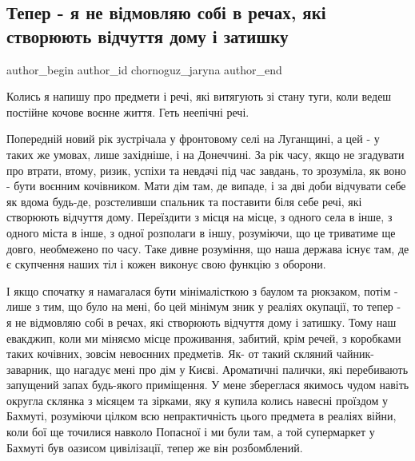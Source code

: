  
 
 
 
 

\subsection{Тепер - я не відмовляю собі в речах, які створюють відчуття дому і затишку}
\label{sec:31_12_2022.fb.chornoguz_jaryna.1.teper___ya_ne_v_dmov}

\ifcmt
 author_begin
   author_id chornoguz_jaryna
 author_end
\fi

Колись я напишу про предмети і речі, які витягують зі стану туги, коли ведеш
постійне кочове воєнне життя. Геть неепічні речі.

Попередній новий рік зустрічала у фронтовому селі на Луганщині, а цей - у таких
же умовах, лише західніше, і на Донеччині. За рік часу, якщо не згадувати про
втрати, втому, ризик, успіхи та невдачі під час завдань, то зрозуміла, як воно
- бути воєнним кочівником. Мати дім там, де випаде, і за дві доби відчувати
себе як вдома будь-де, розстеливши спальник та поставити біля себе речі, які
створюють відчуття дому. Переїздити з місця на місце, з одного села в інше, з
одного міста в інше, з одної розполаги в іншу, розуміючи, що це триватиме ще
довго, необмежено по часу. Таке дивне розуміння, що наша держава існує там, де
є скупчення наших тіл і кожен виконує свою функцію з оборони.

І якщо спочатку я намагалася бути мінімалісткою з баулом та рюкзаком, потім -
лише з тим, що було на мені, бо цей мінімум зник у реаліях окупації, то тепер -
я не відмовляю собі в речах, які створюють відчуття дому і затишку. Тому наш
евакджип, коли ми міняємо місце проживання, забитий, крім речей, з коробками
таких кочівних, зовсім невоєнних предметів. Як- от такий скляний
чайник-заварник, що нагадує мені про дім у Києві. Ароматичні палички, які
перебивають запущений запах будь-якого приміщення. У мене збереглася якимось
чудом навіть округла склянка з місяцем та зірками, яку я купила колись навесні
проїздом у Бахмуті, розуміючи цілком всю непрактичність цього предмета в
реаліях війни, коли бої ще точилися навколо Попасної і ми були там, а той
супермаркет у Бахмуті був оазисом цивілізації, тепер же він розбомблений. 

